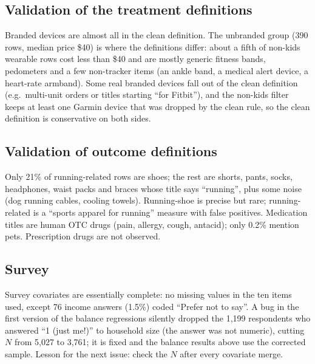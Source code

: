 \documentclass[11pt]{article}
\begin{document}
\subsection*{Validation of the treatment definitions}
\begin{center}\small\end{center}
Branded devices are almost all in the clean definition. The unbranded group (390 rows, median price \$40) is where the definitions differ: about a fifth of non-kids wearable rows cost less than \$40 and are mostly generic fitness bands, pedometers and a few non-tracker items (an ankle band, a medical alert device, a heart-rate armband). Some real branded devices fall out of the clean definition (e.g.\ multi-unit orders or titles starting ``for Fitbit''), and the non-kids filter keeps at least one Garmin device that was dropped by the clean rule, so the clean definition is conservative on both sides.

\subsection*{Validation of outcome definitions}
Only 21\% of running-related rows are shoes; the rest are shorts, pants, socks, headphones, waist packs and braces whose title says ``running'', plus some noise (dog running cables, cooling towels). Running-shoe is precise but rare; running-related is a ``sports apparel for running'' measure with false positives. Medication titles are human OTC drugs (pain, allergy, cough, antacid); only 0.2\% mention pets. Prescription drugs are not observed.

\subsection*{Survey}
\begin{center}\small\end{center}
Survey covariates are essentially complete: no missing values in the ten items used, except 76 income answers (1.5\%) coded ``Prefer not to say''. A bug in the first version of the balance regressions silently dropped the 1{,}199 respondents who answered ``1 (just me!)'' to household size (the answer was not numeric), cutting $N$ from 5{,}027 to 3{,}761; it is fixed and the balance results above use the corrected sample. Lesson for the next issue: check the $N$ after every covariate merge.
\end{document}
